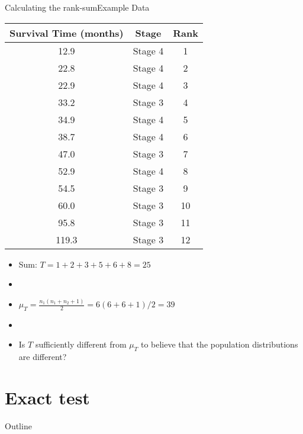 \documentclass[xcolor=dvipsnames]{beamer}
\begin{document}
\begin{frame}{Calculating the rank-sum}{Example Data}
\begin{center}{\tiny
	\begin{tabular}{|c|c|c|}
		\hline
		\textbf{Survival Time (months)} &  \textbf{Stage} & \textbf{Rank}\\ \hline \hline
		12.9 &Stage 4 & 1 \\ \hline
		22.8 &Stage 4 & 2\\ \hline
		22.9& Stage 4 & 3\\ \hline
		33.2 &Stage 3 & 4\\ \hline
		34.9& Stage 4 & 5\\ \hline
		38.7 &Stage 4 & 6\\ \hline
		47.0 &Stage 3 & 7\\ \hline		
		52.9  &Stage 4 & 8\\ \hline
		54.5 &Stage 3 & 9\\ \hline				
		60.0 &Stage 3 & 10\\ \hline
		95.8& Stage 3 & 11\\ \hline
		119.3 &Stage 3 & 12\\ \hline
	\end{tabular}}
\end{center}
\begin{itemize}
	\item Sum: $T = 1 + 2 + 3 + 5 + 6 + 8 = 25$
	\item[]
	\item $\mu_T = \frac{n_1 (n_1 + n_2 + 1)}{2} = 6(6+6+1)/2 = 39$
	\item[]
	\item Is $T$ sufficiently different from $\mu_T$ to believe that the population distributions are different?
\end{itemize}
\end{frame}

\section{Exact test}
\begin{frame}{Outline}
\tableofcontents[currentsection,subsectionstyle=show/shaded/hide]
\end{frame}
\end{document}
